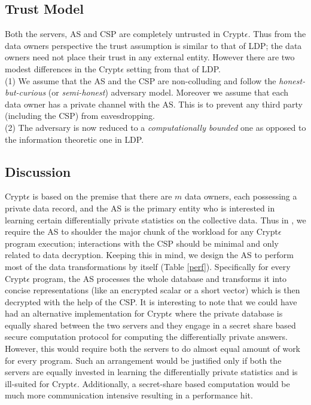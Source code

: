 \subsection{Trust Model}\label{sec:trust}
Both the servers, \textsf{AS} and \textsf{CSP} are completely untrusted in Crypt$\epsilon$. 
Thus from the data owners perspective the trust assumption is similar to that of \textsf{LDP}; the data owners need not place their trust in any external entity. 
However there are two modest differences in the Crypt$\epsilon$ setting from that of \textsf{LDP}.\\
 (1) We assume that the \textsf{AS} and the \textsf{CSP} are non-colluding and follow the \emph{honest-but-curious} (or \textit{semi-honest}) adversary model. %
 Moreover we assume that each data owner has a private channel with the \textsf{AS}. This is to prevent any third party (including the \textsf{CSP}) from eavesdropping. \\
 (2) The adversary is now reduced to a \textit{computationally bounded} one as opposed to the information theoretic one  in \textsf{LDP}.
 


\subsection{Discussion}\label{sec:discuss-arch}
 Crypt$\epsilon$  is based on the premise that there are $m$  data owners, each possessing a private data record, and the \textsf{AS} is the primary entity who is interested in learning certain differentially private statistics on the collective data.  Thus in \system, we require the \textsf{AS} to  shoulder the major chunk of the workload for any Crypt$\epsilon$ program execution; interactions with the \textsf{CSP} should be minimal and only related to data decryption.
Keeping this in  mind, we design the \textsf{AS} to perform most of the data transformations by itself (Table \ref{perf}). Specifically for every Crypt$\epsilon$ program, the \textsf{AS} processes the whole database and transforms it into concise representations (like an encrypted scalar or a short vector) which is then decrypted with the help of the \textsf{CSP}. It is interesting to note that we could have had an alternative implementation for Crypt$\epsilon$ where the private database is equally shared between the two servers and they engage in a secret share based secure computation protocol for computing the differentially private answers. However, this would require both the servers to do almost equal amount of work for every program. Such an arrangement would be justified only if both the servers are equally invested in learning the differentially private statistics and is ill-suited for Crypt$\epsilon$. Additionally, a secret-share based computation would be much more communication intensive resulting in a performance hit. 


